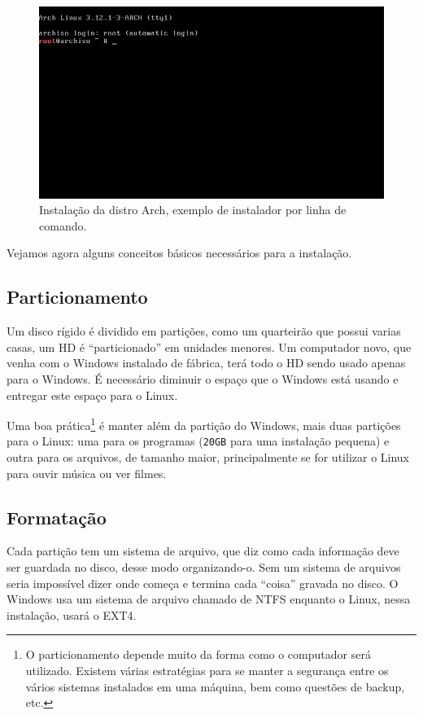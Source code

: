 \documentclass{handout_utfpr}
\begin{document}
\begin{figure}[H]
    \centering
    \includegraphics[scale=.5]{imagens/arch-install-01.png}
    \caption{Instalação da distro Arch, exemplo de instalador por linha de comando.}
    \label{fig:arch-installer}
\end{figure}

Vejamos agora alguns conceitos básicos necessários para a instalação.

\subsection{Particionamento}
Um disco rígido é dividido em partições, como um quarteirão que possui varias casas, um HD é ``particionado'' em unidades menores. Um computador novo, que venha com o Windows instalado de fábrica, terá todo o HD sendo usado apenas para o Windows. É necessário diminuir o espaço que o Windows está usando e entregar este espaço para o Linux.

Uma boa prática\footnote{O particionamento depende muito da forma como o computador será utilizado. Existem várias estratégias para se manter a segurança entre os vários sistemas instalados em uma máquina, bem como questões de backup, etc.} é manter além da partição do Windows, mais duas partições para o Linux: uma para os programas (\texttt{20GB} para uma instalação pequena) e outra para os arquivos, de tamanho maior, principalmente se for utilizar o Linux para ouvir música ou ver filmes.



\subsection{Formatação}
Cada partição tem um sistema de arquivo, que diz como cada informação deve ser guardada no disco, desse modo organizando-o. Sem um sistema de arquivos seria impossível dizer onde começa e termina cada ``coisa'' gravada no disco. O Windows usa um sistema de arquivo chamado de NTFS enquanto o Linux, nessa instalação, usará o EXT4.
\end{document}
